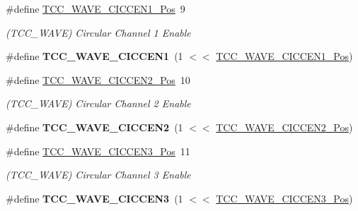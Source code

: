 \begin{DoxyCompactItemize}
\item 
\hypertarget{group___s_a_m_l21___t_c_c_ga321727c1fb0e475d6e424901b820e1ee}{}\#define \hyperlink{group___s_a_m_l21___t_c_c_ga321727c1fb0e475d6e424901b820e1ee}{T\+C\+C\+\_\+\+W\+A\+V\+E\+\_\+\+C\+I\+C\+C\+E\+N1\+\_\+\+Pos}~9\label{group___s_a_m_l21___t_c_c_ga321727c1fb0e475d6e424901b820e1ee}

\begin{DoxyCompactList}\small\item\em (T\+C\+C\+\_\+\+W\+A\+V\+E) Circular Channel 1 Enable \end{DoxyCompactList}\item 
\hypertarget{group___s_a_m_l21___t_c_c_ga9574206228d2be1b72a81ee56f6cdcee}{}\#define {\bfseries T\+C\+C\+\_\+\+W\+A\+V\+E\+\_\+\+C\+I\+C\+C\+E\+N1}~(1 $<$$<$ \hyperlink{group___s_a_m_l21___t_c_c_ga321727c1fb0e475d6e424901b820e1ee}{T\+C\+C\+\_\+\+W\+A\+V\+E\+\_\+\+C\+I\+C\+C\+E\+N1\+\_\+\+Pos})\label{group___s_a_m_l21___t_c_c_ga9574206228d2be1b72a81ee56f6cdcee}

\item 
\hypertarget{group___s_a_m_l21___t_c_c_ga609dee8a280e56aef032298bd18eae03}{}\#define \hyperlink{group___s_a_m_l21___t_c_c_ga609dee8a280e56aef032298bd18eae03}{T\+C\+C\+\_\+\+W\+A\+V\+E\+\_\+\+C\+I\+C\+C\+E\+N2\+\_\+\+Pos}~10\label{group___s_a_m_l21___t_c_c_ga609dee8a280e56aef032298bd18eae03}

\begin{DoxyCompactList}\small\item\em (T\+C\+C\+\_\+\+W\+A\+V\+E) Circular Channel 2 Enable \end{DoxyCompactList}\item 
\hypertarget{group___s_a_m_l21___t_c_c_gac14a9a5a30aebb1b7a0cc7c503f2be5a}{}\#define {\bfseries T\+C\+C\+\_\+\+W\+A\+V\+E\+\_\+\+C\+I\+C\+C\+E\+N2}~(1 $<$$<$ \hyperlink{group___s_a_m_l21___t_c_c_ga609dee8a280e56aef032298bd18eae03}{T\+C\+C\+\_\+\+W\+A\+V\+E\+\_\+\+C\+I\+C\+C\+E\+N2\+\_\+\+Pos})\label{group___s_a_m_l21___t_c_c_gac14a9a5a30aebb1b7a0cc7c503f2be5a}

\item 
\hypertarget{group___s_a_m_l21___t_c_c_gadf26460d87340651f1e26703cf5855e0}{}\#define \hyperlink{group___s_a_m_l21___t_c_c_gadf26460d87340651f1e26703cf5855e0}{T\+C\+C\+\_\+\+W\+A\+V\+E\+\_\+\+C\+I\+C\+C\+E\+N3\+\_\+\+Pos}~11\label{group___s_a_m_l21___t_c_c_gadf26460d87340651f1e26703cf5855e0}

\begin{DoxyCompactList}\small\item\em (T\+C\+C\+\_\+\+W\+A\+V\+E) Circular Channel 3 Enable \end{DoxyCompactList}\item 
\hypertarget{group___s_a_m_l21___t_c_c_ga519e415aaedbd155f68f97acbda775ed}{}\#define {\bfseries T\+C\+C\+\_\+\+W\+A\+V\+E\+\_\+\+C\+I\+C\+C\+E\+N3}~(1 $<$$<$ \hyperlink{group___s_a_m_l21___t_c_c_gadf26460d87340651f1e26703cf5855e0}{T\+C\+C\+\_\+\+W\+A\+V\+E\+\_\+\+C\+I\+C\+C\+E\+N3\+\_\+\+Pos})\label{group___s_a_m_l21___t_c_c_ga519e415aaedbd155f68f97acbda775ed}


\end{DoxyCompactItemize}
